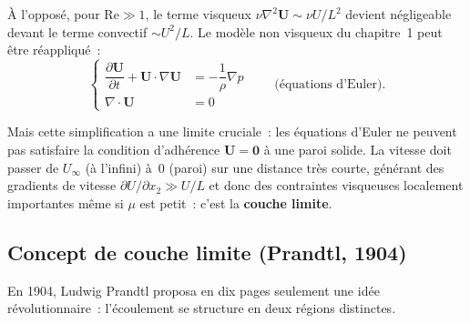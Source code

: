 \documentclass[11pt,a4paper]{report}
\newcommand{\pd}[2]{\dfrac{\partial #1}{\partial #2}}
\begin{document}
\`A l'oppos\'e, pour $\mathrm{Re} \gg 1$, le terme visqueux $\nu\nabla^2\bm{U}
\sim \nu U/L^2$ devient n\'egligeable devant le terme convectif $\sim U^2/L$. Le
mod\`ele non visqueux du chapitre~1 peut \^etre r\'eappliqu\'e~:
\[
  \left\{\begin{aligned}
    \pd{\bm{U}}{t} + \bm{U}\cdot\nabla\bm{U} &= -\dfrac{1}{\rho}\nabla p \\[6pt]
    \nabla\cdot\bm{U} &= 0
  \end{aligned}\right.
  \qquad\text{(\'equations d'Euler).}
\]

Mais cette simplification a une limite cruciale~: les \'equations d'Euler ne peuvent
pas satisfaire la condition d'adh\'erence $\bm{U}=\bm{0}$ \`a une paroi solide. La
vitesse doit passer de $U_\infty$ (\`a l'infini) \`a~0 (paroi) sur une distance tr\`es
courte, g\'en\'erant des gradients de vitesse $\partial U/\partial x_2 \gg U/L$ et donc
des contraintes visqueuses localement importantes m\^eme si $\mu$ est petit~: c'est la
\textbf{couche limite}.

\subsection{Concept de couche limite (Prandtl, 1904)}

En 1904, Ludwig Prandtl proposa en dix pages seulement une id\'ee r\'evolutionnaire~:
l'\'ecoulement se structure en deux r\'egions distinctes.

\begin{center}
\end{center}
\end{document}

